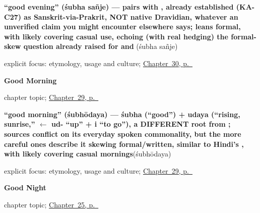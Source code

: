 \noindent\begin{minipage}[t]{\linewidth}
\raggedright
\textbf{\textquotedblleft{}good evening\textquotedblright{} (śubha sañje) — pairs with , already established (KA-C27) as Sanskrit-via-Prakrit, NOT native Dravidian, whatever an unverified claim you might encounter elsewhere says; leans formal, with  likely covering casual use, echoing (with real hedging) the formal-skew question already raised for  and }\enspace\emph{ }\enspace(śubha sañje)\par
\footnotesize explicit focus: etymology, usage and culture; \hyperref[ch:ka-good-evening]{Chapter~30, p.~\pageref*{ch:ka-good-evening}}
\end{minipage}\par\smallskip

\noindent\begin{minipage}[t]{\linewidth}
\raggedright
\textbf{Good Morning}\par
\footnotesize chapter topic; \hyperref[ch:ka-good-morning]{Chapter~29, p.~\pageref*{ch:ka-good-morning}}
\end{minipage}\par\smallskip

\noindent\begin{minipage}[t]{\linewidth}
\raggedright
\textbf{\textquotedblleft{}good morning\textquotedblright{} (śubhōdaya) — śubha (\textquotedblleft{}good\textquotedblright{}) + udaya (\textquotedblleft{}rising, sunrise,\textquotedblright{} $\leftarrow$ ud- \textquotedblleft{}up\textquotedblright{} + i \textquotedblleft{}to go\textquotedblright{}), a DIFFERENT root from ; sources conflict on its everyday spoken commonality, but the more careful ones describe it skewing formal/written, similar to Hindi's , with  likely covering casual mornings}\enspace\emph{}\enspace(śubhōdaya)\par
\footnotesize explicit focus: etymology, usage and culture; \hyperref[ch:ka-good-morning]{Chapter~29, p.~\pageref*{ch:ka-good-morning}}
\end{minipage}\par\smallskip

\noindent\begin{minipage}[t]{\linewidth}
\raggedright
\textbf{Good Night}\par
\footnotesize chapter topic; \hyperref[ch:ka-good-night]{Chapter~25, p.~\pageref*{ch:ka-good-night}}
\end{minipage}\par\smallskip

